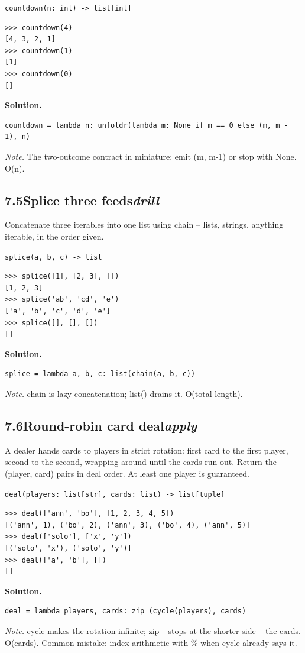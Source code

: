 \documentclass[10pt,letterpaper]{book}
\begin{document}
\noindent\texttt{countdown(n: int) -> list[int]}
\begin{lstlisting}[style=ex]
>>> countdown(4)
[4, 3, 2, 1]
>>> countdown(1)
[1]
>>> countdown(0)
[]
\end{lstlisting}
\noindent\textbf{Solution.}
\begin{lstlisting}[style=code]
countdown = lambda n: unfoldr(lambda m: None if m == 0 else (m, m - 1), n)
\end{lstlisting}
\noindent\textit{Note.} The two-outcome contract in miniature: emit (m, m-1) or stop with None. O(n).

\subsection*{7.5\quad Splice three feeds\hfill\textnormal{\textit{drill}}}
Concatenate three iterables into one list using chain -- lists, strings, anything iterable, in the order given.

\noindent\texttt{splice(a, b, c) -> list}
\begin{lstlisting}[style=ex]
>>> splice([1], [2, 3], [])
[1, 2, 3]
>>> splice('ab', 'cd', 'e')
['a', 'b', 'c', 'd', 'e']
>>> splice([], [], [])
[]
\end{lstlisting}
\noindent\textbf{Solution.}
\begin{lstlisting}[style=code]
splice = lambda a, b, c: list(chain(a, b, c))
\end{lstlisting}
\noindent\textit{Note.} chain is lazy concatenation; list() drains it. O(total length).

\subsection*{7.6\quad Round-robin card deal\hfill\textnormal{\textit{apply}}}
A dealer hands cards to players in strict rotation: first card to the first player, second to the second, wrapping around until the cards run out. Return the (player, card) pairs in deal order. At least one player is guaranteed.

\noindent\texttt{deal(players: list[str], cards: list) -> list[tuple]}
\begin{lstlisting}[style=ex]
>>> deal(['ann', 'bo'], [1, 2, 3, 4, 5])
[('ann', 1), ('bo', 2), ('ann', 3), ('bo', 4), ('ann', 5)]
>>> deal(['solo'], ['x', 'y'])
[('solo', 'x'), ('solo', 'y')]
>>> deal(['a', 'b'], [])
[]
\end{lstlisting}
\noindent\textbf{Solution.}
\begin{lstlisting}[style=code]
deal = lambda players, cards: zip_(cycle(players), cards)
\end{lstlisting}
\noindent\textit{Note.} cycle makes the rotation infinite; zip\_ stops at the shorter side -- the cards. O(cards). Common mistake: index arithmetic with \% when cycle already says it.
\end{document}
